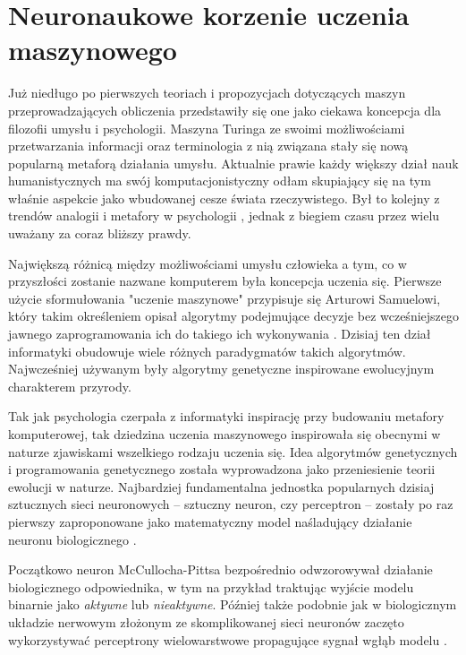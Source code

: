 \chapter{Neuronaukowe korzenie uczenia maszynowego}

Już niedługo po pierwszych teoriach i propozycjach dotyczących maszyn przeprowadzających obliczenia przedstawiły się one jako ciekawa koncepcja dla filozofii umysłu i psychologii.
Maszyna Turinga ze swoimi możliwościami przetwarzania informacji oraz terminologia z nią związana stały się nową popularną metaforą działania umysłu.
Aktualnie prawie każdy większy dział nauk humanistycznych ma swój komputacjonistyczny odłam skupiający się na tym właśnie aspekcie jako wbudowanej cesze świata rzeczywistego.
Był to kolejny z trendów analogii i metafory w psychologii \cite{vroon1987man}, jednak z biegiem czasu przez wielu uważany za coraz bliższy prawdy.

Największą różnicą między możliwościami umysłu człowieka a tym, co w przyszłości zostanie nazwane komputerem była koncepcja uczenia się.
Pierwsze użycie sformułowania "uczenie maszynowe" przypisuje się Arturowi Samuelowi, który takim określeniem opisał algorytmy podejmujące decyzje bez wcześniejszego jawnego zaprogramowania ich do takiego ich wykonywania \cite{koza1996automated}.
Dzisiaj ten dział informatyki obudowuje wiele różnych paradygmatów takich algorytmów.
Najwcześniej używanym były algorytmy genetyczne inspirowane ewolucyjnym charakterem przyrody.

Tak jak psychologia czerpała z informatyki inspirację przy budowaniu metafory komputerowej, tak dziedzina uczenia maszynowego inspirowała się obecnymi w naturze zjawiskami wszelkiego rodzaju uczenia się.
Idea algorytmów genetycznych i programowania genetycznego została wyprowadzona jako przeniesienie teorii ewolucji w naturze.
Najbardziej fundamentalna jednostka popularnych dzisiaj sztucznych sieci neuronowych -- sztuczny neuron, czy perceptron -- zostały po raz pierwszy zaproponowane jako matematyczny model naśladujący działanie neuronu biologicznego \cite{mcculloch1943logical}.

Początkowo neuron McCullocha-Pittsa bezpośrednio odwzorowywał działanie biologicznego odpowiednika, w tym na przykład traktując wyjście modelu binarnie jako \emph{aktywne} lub \emph{nieaktywne}.
Później także podobnie jak w biologicznym układzie nerwowym złożonym ze skomplikowanej sieci neuronów zaczęto wykorzystywać perceptrony wielowarstwowe propagujące sygnał wgłąb modelu \cite{rosenblatt1961principles}.

